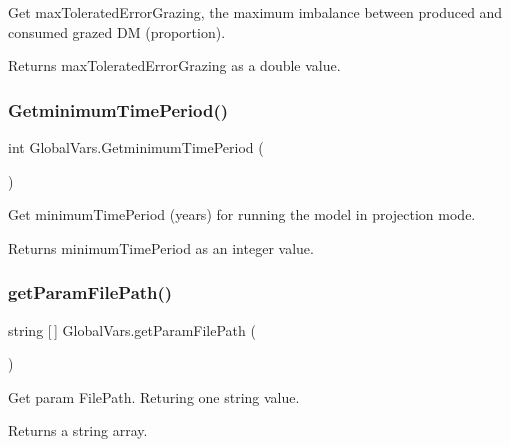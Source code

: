 Get max\+Tolerated\+Error\+Grazing, the maximum imbalance between produced and consumed grazed DM (proportion). 

\begin{DoxyReturn}{Returns}
max\+Tolerated\+Error\+Grazing as a double value. 
\end{DoxyReturn}
\mbox{\label{class_global_vars_a05ac334d81bb66ad2ffc14bc0bd50d8f}} 
\subsubsection{\texorpdfstring{GetminimumTimePeriod()}{GetminimumTimePeriod()}}
{\footnotesize\ttfamily int Global\+Vars.\+Getminimum\+Time\+Period (\begin{DoxyParamCaption}{ }\end{DoxyParamCaption})\hspace{0.3cm}{\ttfamily [inline]}}



Get minimum\+Time\+Period (years) for running the model in projection mode. 

\begin{DoxyReturn}{Returns}
minimum\+Time\+Period as an integer value. 
\end{DoxyReturn}
\mbox{\label{class_global_vars_a07f6f253145eaf5be0d60004cc5eddaa}} 
\subsubsection{\texorpdfstring{getParamFilePath()}{getParamFilePath()}}
{\footnotesize\ttfamily string \mbox{[}$\,$\mbox{]} Global\+Vars.\+get\+Param\+File\+Path (\begin{DoxyParamCaption}{ }\end{DoxyParamCaption})\hspace{0.3cm}{\ttfamily [inline]}}



Get param File\+Path. Returing one string value. 

\begin{DoxyReturn}{Returns}
a string array. 
\end{DoxyReturn}
\mbox{\label{class_global_vars_a120f63405f7efd3dd9f062d9abee01e6}} 
